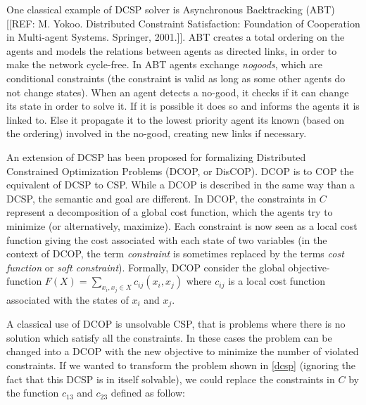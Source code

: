 One classical example of DCSP solver is Asynchronous Backtracking (ABT)[[REF: M. Yokoo. Distributed Constraint Satisfaction: Foundation of Cooperation in Multi-agent Systems. Springer, 2001.]]. ABT creates a total ordering on the agents and models the relations between agents as directed links, in order to make the network cycle-free. In ABT agents exchange \emph{nogoods}, which are conditional constraints (the constraint is valid as long as some other agents do not change states). When an agent detects a no-good, it checks if it can change its state in order to solve it. If it is possible it does so and informs the agents it is linked to. Else it propagate it to the lowest priority agent its known (based on the ordering) involved in the no-good, creating new links if necessary.

An extension of DCSP has been proposed for formalizing Distributed Constrained Optimization Problems (DCOP, or DisCOP). DCOP is to COP the equivalent of DCSP to CSP. While a DCOP is described in the same way than a DCSP, the semantic and goal are different.
In DCOP, the constraints in $C$ represent a decomposition of a global cost function, which the agents try to minimize (or alternatively, maximize). Each constraint is now seen as a local cost function giving the cost associated with each state of two variables (in the context of DCOP, the term \emph{constraint} is sometimes replaced by the terms \emph{cost function} or \emph{soft constraint}). Formally, DCOP consider the global objective-function $F(X) = \sum_{x_i, x_j \in X} c_{ij}(x_i,x_j)$ where $c_{ij}$ is a local cost function associated with the states of $x_i$ and $x_j$.

A classical use of DCOP is unsolvable CSP, that is problems where there is no solution which satisfy all the constraints. In these cases the problem can be changed into a DCOP with the new objective to minimize the number of violated constraints. If we wanted to transform the problem shown in \figurename{} \ref{dcsp} (ignoring the fact that this DCSP is in itself solvable), we could replace the constraints in $C$ by the function $c_{13}$ and $c_{23}$ defined as follow:

